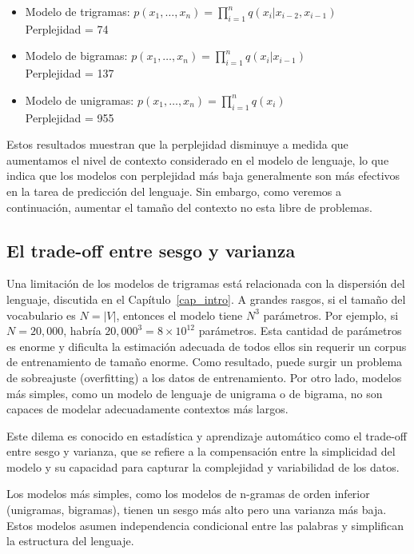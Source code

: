 \begin{itemize}
        \item Modelo de trigramas: $p(x_1, \ldots, x_n) = \prod_{i=1}^n q(x_i | x_{i-2}, x_{i-1})$ \\
        Perplejidad = 74
        \item Modelo de bigramas: $p(x_1, \ldots, x_n) = \prod_{i=1}^n q(x_i | x_{i-1})$ \\
        Perplejidad = 137
        \item Modelo de unigramas: $p(x_1, \ldots, x_n) = \prod_{i=1}^n q(x_i)$ \\
        Perplejidad = 955
    \end{itemize}
    
Estos resultados muestran que la perplejidad disminuye a medida que aumentamos el nivel de contexto considerado en el modelo de lenguaje, lo que indica que los modelos con perplejidad más baja generalmente son más efectivos en la tarea de predicción del lenguaje. Sin embargo, como veremos a continuación, aumentar el tamaño del contexto no esta libre de problemas.   

\subsection{El trade-off entre sesgo y varianza}

Una limitación de los modelos de trigramas está relacionada con la dispersión del lenguaje, discutida en el Capítulo~\ref{cap_intro}. A grandes rasgos, si el tamaño del vocabulario es $N = |V|$, entonces el modelo tiene $N^3$ parámetros. Por ejemplo, si $N = 20,000$, habría $20,000^3 = 8 \times 10^{12}$ parámetros. Esta cantidad de parámetros es enorme y dificulta la estimación adecuada de todos ellos sin requerir un corpus de entrenamiento de tamaño enorme. Como resultado, puede surgir un problema de sobreajuste (overfitting) a los datos de entrenamiento. Por otro lado, modelos más simples, como un modelo de lenguaje de unigrama o de bigrama, no son capaces de modelar adecuadamente contextos más largos.

Este dilema es conocido en estadística y aprendizaje automático como el trade-off entre sesgo y varianza, que se refiere a la compensación entre la simplicidad del modelo y su capacidad para capturar la complejidad y variabilidad de los datos.

Los modelos más simples, como los modelos de n-gramas de orden inferior (unigramas, bigramas), tienen un sesgo más alto pero una varianza más baja. Estos modelos asumen independencia condicional entre las palabras y simplifican la estructura del lenguaje.

